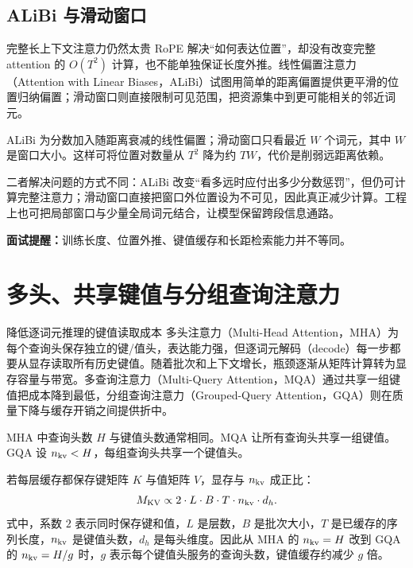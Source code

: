 \section{ALiBi 与滑动窗口}

\begin{motivationbox}{完整长上下文注意力仍然太贵}
RoPE 解决“如何表达位置”，却没有改变完整 attention 的 $O(T^2)$ 计算，也不能单独保证长度外推。线性偏置注意力（Attention with Linear Biases，ALiBi）试图用简单的距离偏置提供更平滑的位置归纳偏置；滑动窗口则直接限制可见范围，把资源集中到更可能相关的邻近词元。
\end{motivationbox}

ALiBi 为分数加入随距离衰减的线性偏置；滑动窗口只看最近 $W$ 个词元，其中 $W$ 是窗口大小。这样可将位置对数量从 $T^2$ 降为约 $TW$，代价是削弱远距离依赖。

二者解决问题的方式不同：ALiBi 改变“看多远时应付出多少分数惩罚”，但仍可计算完整注意力；滑动窗口直接把窗口外位置设为不可见，因此真正减少计算。工程上也可把局部窗口与少量全局词元结合，让模型保留跨段信息通路。

\enlargethispage{\baselineskip}
\textbf{面试提醒：}训练长度、位置外推、键值缓存和长距检索能力并不等同。

\chapter{多头、共享键值与分组查询注意力}
\label{sec:gqa}

\figMhaMqaGqa

\begin{motivationbox}{降低逐词元推理的键值读取成本}
多头注意力（Multi-Head Attention，MHA）为每个查询头保存独立的键/值头，表达能力强，但逐词元解码（decode）每一步都要从显存读取所有历史键值。随着批次和上下文增长，瓶颈逐渐从矩阵计算转为显存容量与带宽。多查询注意力（Multi-Query Attention，MQA）通过共享一组键值把成本降到最低，分组查询注意力（Grouped-Query Attention，GQA）则在质量下降与缓存开销之间提供折中。
\end{motivationbox}

MHA 中查询头数 $H$ 与键值头数通常相同。MQA 让所有查询头共享一组键值。GQA 设 $n_{\rm kv}<H$，每组查询头共享一个键值头。

若每层缓存都保存键矩阵 $K$ 与值矩阵 $V$，显存与 $n_{\rm kv}$ 成正比：
\[
M_{\rm KV}\propto 2\cdot L\cdot B\cdot T\cdot n_{\rm kv}\cdot d_h.
\]
式中，系数 $2$ 表示同时保存键和值，$L$ 是层数，$B$ 是批次大小，$T$ 是已缓存的序列长度，$n_{\rm kv}$ 是键值头数，$d_h$ 是每头维度。因此从 MHA 的 $n_{\rm kv}=H$ 改到 GQA 的 $n_{\rm kv}=H/g$ 时，$g$ 表示每个键值头服务的查询头数，键值缓存约减少 $g$ 倍。

